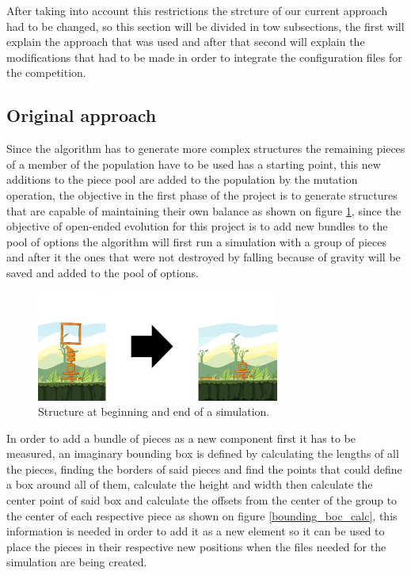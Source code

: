 \documentclass[conference]{IEEEtran}
\begin{document}
After taking into account this restrictions the strcture of our current approach
had to be changed, so this section will be divided in tow subsections, the first
will explain the approach that was used and after that second will explain the
modifications that had to be made in order to integrate the configuration files
for the competition. 

\subsection{Original approach}

Since the algorithm has to generate more complex structures the remaining pieces
of a member of the population have to be used has a starting point, this new
additions to the piece pool are added to the population by the mutation
operation, the objective in the first phase of the project is to generate
structures that are capable of maintaining their own balance as shown on figure
\ref{test_old}, since the objective of open-ended evolution for this project is
to add new bundles to the pool of options the algorithm will first run a
simulation with a group of pieces and after it the ones that were not destroyed
by falling because of gravity will be saved and added to the pool of options.

\begin{figure}[htbp]
\centerline{\includegraphics[width=80mm]{Images/simulation_bef_aft_example.png}}
\caption{Structure at beginning and end of a simulation.}
\label{test_old}
\end{figure}

In order to add a bundle of pieces as a new component first it has to be
measured, an imaginary bounding box is defined by calculating the lengths of all
the pieces, finding the borders of said pieces and find the points that could
define a box around all of them, calculate the height and width then calculate
the center point of said box and calculate the offsets from the center of the
group to the center of each respective piece as shown on figure
\ref{bounding_boc_calc}, this information is needed in order to add it as a new
element so it can be used to place the pieces in their respective new positions
when the files needed for the simulation are being created.
\end{document}
